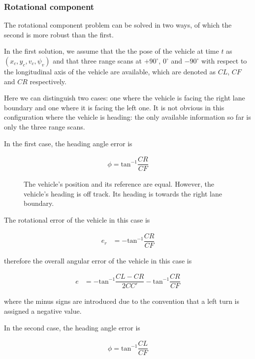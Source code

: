 \subsubsection{Rotational component}

The rotational component problem can be solved in two ways, of which the
second is more robust than the first.

In the first solution, we assume that the the pose of the vehicle at time $t$ as
$(x_c, y_c, v_c, \psi_v)$ and that three range scans
at $+90^\circ$, $0^\circ$ and $-90^\circ$ with respect to the
longitudinal axis of the vehicle are available, which are denoted as
$CL$, $CF$ and $CR$ respectively.

Here we can distinguish two cases: one where the vehicle is facing the right
lane boundary and one where it is facing the left one. It is not obvious
in this configuration where the vehicle is heading: the only available
information so far is only the three range scans.

In the first case, the heading angle error is

\begin{align}
  \phi = \text{tan}^{-1}\dfrac{CR}{CF}
\end{align}

\begin{figure}[H]\centering
  \scalebox{1}{}
  \caption{The vehicle's position and its reference are equal. However,
    the vehicle's heading is off track. Its heading is towards the right
    lane boundary.}
  \label{}
\end{figure}

The rotational error of the vehicle in this case is

\begin{align}
  e_r &= -\text{tan}^{-1}\dfrac{CR}{CF}
\end{align}

therefore the overall angular error of the vehicle in this case is

\begin{align}
  e &= -\text{tan}^{-1}\dfrac{CL-CR}{2CC'} - \text{tan}^{-1}\dfrac{CR}{CF}
\end{align}

where the minus signs are introduced due to the
convention that a left turn is assigned a negative value.


In the second case, the heading angle error is

\begin{align}
  \phi = \text{tan}^{-1}\dfrac{CL}{CF}
\end{align}

